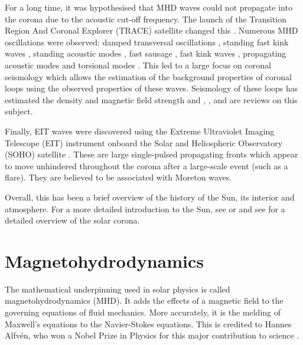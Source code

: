     For a long time, it was hypothesised that MHD waves could not propagate into the corona due to the acoustic cut-off frequency.
    The launch of the Transition Region And Coronal Explorer (TRACE) satellite changed this \citep{TRACE,TRACE1}.
    Numerous MHD oscillations were observed: damped transversal oscillations \citep{8007,2002A&A...394L..39G}, standing fast kink waves \citep{1999ApJ520880A,1999Sci...285..862N,1999SoPh..187..261S}, standing acoustic modes \citep{2003A&A...406.1105W}, fast sausage \citep{2001MNRAS.326..428W,2002MNRAS.336..747W,2003A&A...406..709K}, fast kink waves \citep{2005A&A...430L..65V}, propagating acoustic modes \citep{1997ApJ...491L.111O,2000A&A...355L..23D,2002A&A...393..649M} and torsional modes \citep{1998A&A...337..287E}. 
    This led to a large focus on coronal seismology which allows the estimation of the background properties of coronal loops using the observed properties of these waves.
    Seismology of these loops has estimated the density and magnetic field strength and \cite{2005RSPTA.363.2743D}, \cite{Banerjee2007}, \cite{lrsp-2005-3} and \cite{MHDOS} are reviews on this subject.
    
    Finally, EIT waves were discovered using the Extreme Ultraviolet Imaging Telescope (EIT) instrument onboard the Solar and Heliospheric Observatory (SOHO) satellite \citep{1998GeoRL..25.2465T}.
    These are large single-pulsed propagating fronts which appear to move unhindered throughout the corona after a large-scale event (such as a flare).
    They are believed to be associated with Moreton waves.
        
    Overall, this has been a brief overview of the history of the Sun, its interior and atmosphere. 
    For a more detailed introduction to the Sun, see \cite{priest1984solar} or \cite{2014masu.book.....P} and see \cite{markus2004physics} for a detailed overview of the solar corona.
    
\section{Magnetohydrodynamics}

    The mathematical underpinning used in solar physics is called magnetohydrodynamics (MHD).
    It adds the effects of a magnetic field to the governing equations of fluid mechanics. 
    More accurately, it is the melding of Maxwell's equations to the Navier-Stokes equations.
    This is credited to Hannes Alfv\'en, who won a Nobel Prize in Physics for this major contribution to science \citep{1942Natur.150..405A,erdelyi2007}.

